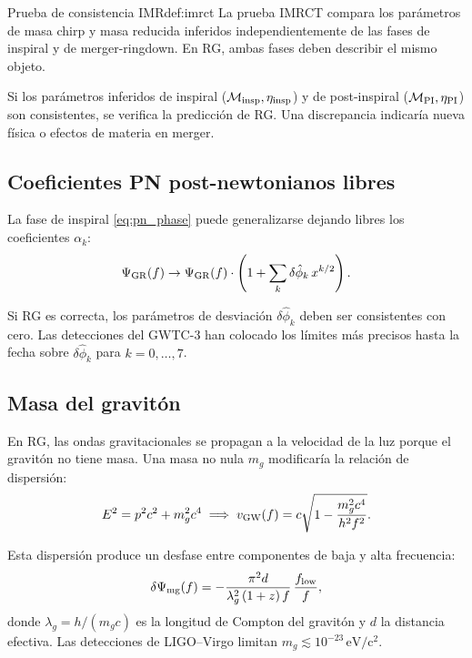 \begin{definicion}{Prueba de consistencia IMR}{def:imrct}
La prueba IMRCT compara los parámetros de masa chirp y masa reducida inferidos independientemente de las fases de inspiral y de merger-ringdown. En RG, ambas fases deben describir el mismo objeto.
\end{definicion}

Si los parámetros inferidos de inspiral ($\mathcal{M}_{\rm insp}, \eta_{\rm insp}$) y de post-inspiral ($\mathcal{M}_{\rm PI}, \eta_{\rm PI}$) son consistentes, se verifica la predicción de RG. Una discrepancia indicaría nueva física o efectos de materia en merger.

\subsection{Coeficientes PN post-newtonianos libres}

La fase de inspiral \eqref{eq:pn_phase} puede generalizarse dejando libres los coeficientes $\alpha_k$:
\begin{equation}
  \Psi_{\rm GR}(f) \to \Psi_{\rm GR}(f)\cdot\left(1 + \sum_k \delta\hat\phi_k\,x^{k/2}\right).
\end{equation}

Si RG es correcta, los parámetros de desviación $\delta\hat\phi_k$ deben ser consistentes con cero. Las detecciones del GWTC-3 han colocado los límites más precisos hasta la fecha sobre $\delta\hat\phi_k$ para $k=0,\ldots,7$.

\subsection{Masa del gravitón}

En RG, las ondas gravitacionales se propagan a la velocidad de la luz porque el gravitón no tiene masa. Una masa no nula $m_g$ modificaría la relación de dispersión:
\begin{equation}
  E^2 = p^2c^2 + m_g^2c^4
  \implies v_{\rm GW}(f) = c\sqrt{1 - \frac{m_g^2c^4}{h^2f^2}}.
  \label{eq:graviton_mass}
\end{equation}

Esta dispersión produce un desfase entre componentes de baja y alta frecuencia:
\begin{equation}
  \delta\Psi_{\rm mg}(f) = -\frac{\pi^2 d}{\lambda_g^2\,(1+z)\,f}\,\frac{f_{\rm low}}{f},
\end{equation}
donde $\lambda_g = h/(m_g c)$ es la longitud de Compton del gravitón y $d$ la distancia efectiva. Las detecciones de LIGO--Virgo limitan $m_g\lesssim 10^{-23}\,\mathrm{eV/c^2}$.

